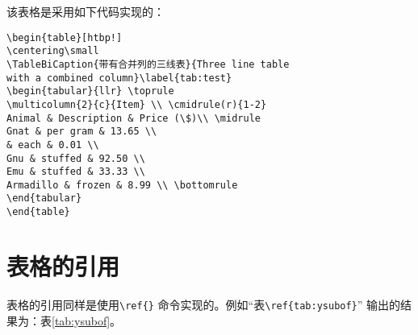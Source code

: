 该表格是采用如下代码实现的：
\begin{verbatim}
\begin{table}[htbp!]
\centering\small
\TableBiCaption{带有合并列的三线表}{Three line table
with a combined column}\label{tab:test}
\begin{tabular}{llr} \toprule
\multicolumn{2}{c}{Item} \\ \cmidrule(r){1-2}
Animal & Description & Price (\$)\\ \midrule
Gnat & per gram & 13.65 \\
& each & 0.01 \\
Gnu & stuffed & 92.50 \\
Emu & stuffed & 33.33 \\
Armadillo & frozen & 8.99 \\ \bottomrule
\end{tabular}
\end{table}
\end{verbatim}

\section{表格的引用}\label{section3-3}
表格的引用同样是使用\verb|\ref{}| 命令实现的。例如“表\verb|\ref{tab:ysubof}|” 输出的结果为：表\ref{tab:ysubof}。


